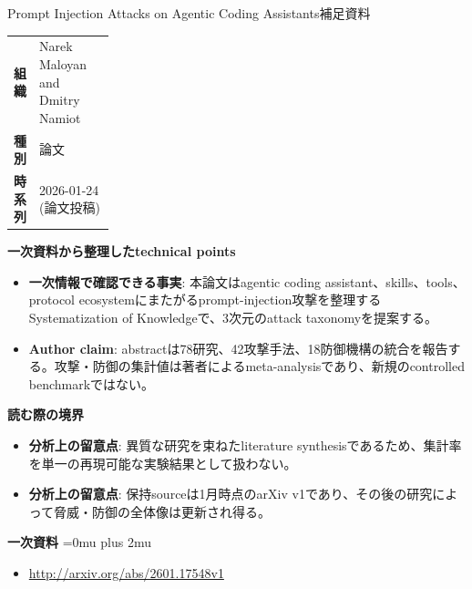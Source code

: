 \begin{technicalnote}{Prompt Injection Attacks on Agentic Coding Assistants}{補足資料}
\begingroup
\begin{tabularx}{\linewidth}{@{}>{\bfseries}p{0.22\linewidth}X@{}}
組織 & Narek Maloyan and Dmitry Namiot \\
種別 & 論文 \\
時系列 & 2026-01-24 (論文投稿) \\
\end{tabularx}
\smallskip
{\bfseries 一次資料から整理したtechnical points}
\begin{itemize}[leftmargin=1.5em,itemsep=0.35em]
\item \textbf{一次情報で確認できる事実}: 本論文はagentic coding assistant、skills、tools、protocol ecosystemにまたがるprompt-injection攻撃を整理するSystematization of Knowledgeで、3次元のattack taxonomyを提案する。
\item \textbf{Author claim}: abstractは78研究、42攻撃手法、18防御機構の統合を報告する。攻撃・防御の集計値は著者によるmeta-analysisであり、新規のcontrolled benchmarkではない。
\end{itemize}
\begin{minipage}{\linewidth}
{\bfseries 読む際の境界}
\begin{itemize}[leftmargin=1.5em,itemsep=0.35em]
\item \textbf{分析上の留意点}: 異質な研究を束ねたliterature synthesisであるため、集計率を単一の再現可能な実験結果として扱わない。
\item \textbf{分析上の留意点}: 保持sourceは1月時点のarXiv v1であり、その後の研究によって脅威・防御の全体像は更新され得る。
\end{itemize}
\begin{samepage}
{\bfseries 一次資料}
\begingroup\sloppy
\Urlmuskip=0mu plus 2mu\relax
\begin{itemize}[leftmargin=1.5em,itemsep=0.25em]
\item {\scriptsize\url{http://arxiv.org/abs/2601.17548v1}}
\end{itemize}
\endgroup
\end{samepage}
\end{minipage}
\endgroup
\end{technicalnote}
\medskip

